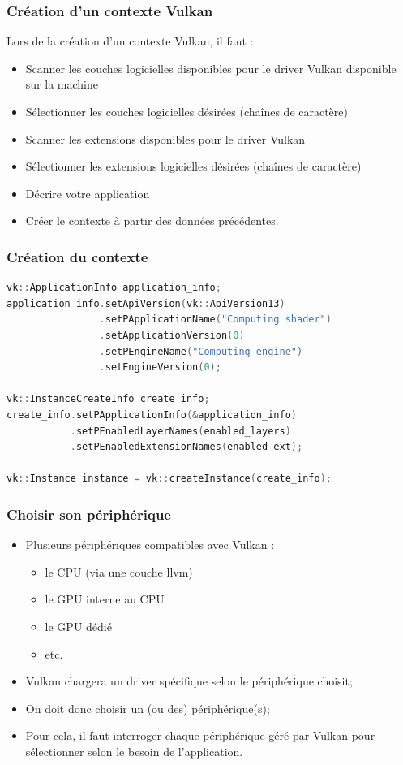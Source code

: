\documentclass{beamer}
\begin{document}
\begin{frame}[fragile]
\frametitle{Création d'un contexte Vulkan}
Lors de la création d'un contexte Vulkan, il faut :
\begin{itemize}
\item Scanner les couches logicielles disponibles pour le driver Vulkan disponible sur la machine
\item Sélectionner les couches logicielles désirées (chaînes de caractère)
\item Scanner les extensions disponibles pour le driver Vulkan
\item Sélectionner les extensions logicielles désirées (chaînes de caractère)
\item Décrire votre application
\item Créer le contexte à partir des données précédentes.
\end{itemize}
\end{frame}

\begin{frame}[fragile]
\frametitle{Création du contexte}

\lstset{style=customcpp}
\begin{lstlisting}[language=C++]
vk::ApplicationInfo application_info;
application_info.setApiVersion(vk::ApiVersion13)
                .setPApplicationName("Computing shader")
                .setApplicationVersion(0)
                .setPEngineName("Computing engine")
                .setEngineVersion(0);

vk::InstanceCreateInfo create_info;
create_info.setPApplicationInfo(&application_info)
           .setPEnabledLayerNames(enabled_layers)
           .setPEnabledExtensionNames(enabled_ext);

vk::Instance instance = vk::createInstance(create_info);
\end{lstlisting}
\end{frame}

\begin{frame}[fragile]
\frametitle{Choisir son périphérique}

\begin{itemize}
\item Plusieurs périphériques compatibles avec Vulkan :
  \begin{itemize}
  \item le CPU (via une couche llvm)
  \item le GPU interne au CPU 
  \item le GPU dédié
  \item etc.
  \end{itemize}
\item Vulkan chargera un driver spécifique selon le périphérique choisit;
\item On doit donc choisir un (ou des) périphérique(s);
\item Pour cela, il faut interroger chaque périphérique géré par Vulkan pour sélectionner selon le besoin de l'application.
\end{itemize}
\end{frame}
\end{document}
